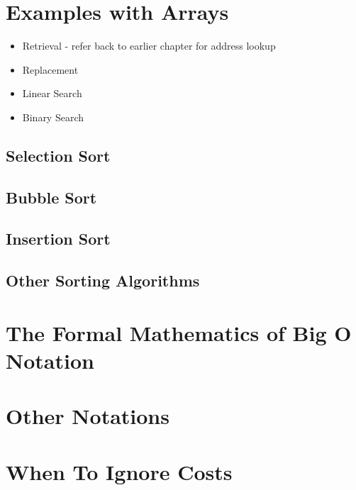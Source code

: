 \section{Examples with Arrays}




\begin{itemize}
	
	\item Retrieval  - refer back to earlier chapter for address lookup 
	\item Replacement
	\item Linear Search
	\item Binary Search
\end{itemize}



\subsection{Selection Sort}



\subsection{Bubble Sort}
\subsection{Insertion Sort}
\subsection{Other Sorting Algorithms}


\section{The Formal Mathematics of Big O Notation}
\section{Other Notations}


\section{When To Ignore Costs}